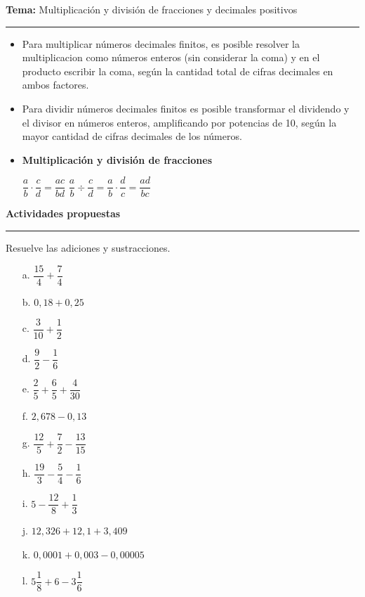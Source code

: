 \documentclass[spanish,letterpaper, 11pt, addpoints, answers]{exam}
\begin{document}
\begin{questions}
\newpage
  \vspace{0.1in}
  \parbox{6in}{
  \textbf{Tema:} Multiplicación y división de fracciones y decimales positivos}
  \vspace{0.15in}
  \hrule 
  
  \begin{itemize}
    \item Para multiplicar números decimales finitos, es posible resolver la multiplicacion como números enteros (sin considerar la coma) y en el producto escribir la coma, según la cantidad total de cifras decimales en ambos factores.
  
    \item Para dividir números decimales finitos es posible transformar el dividendo y el divisor en números enteros, amplificando por potencias de 10, según la mayor cantidad de cifras decimales de los números.

    \item \textbf{Multiplicación y división de fracciones}
\begin{center}
$\dfrac{a}{b}\cdot\dfrac{c}{d}=\dfrac{ac}{bd}$ \hspace{2cm} $\dfrac{a}{b}\div\dfrac{c}{d}=\dfrac{a}{b}\cdot\dfrac{d}{c}=\dfrac{ad}{bc}$

\end{center}

    
  \end{itemize}
  
  \parbox{6in}{
  \textbf{Actividades propuestas}}
  \vspace{0.15in}
  \hrule 

  \question Resuelve las adiciones y sustracciones.

  \begin{multicols}{2}
    
 
  \begin{itemize}
    \item[a.] $\dfrac{15}{4}+\dfrac{7}{4}$
    \item[b.] $0{,}18+0{,}25$
    \item[c.] $\dfrac{3}{10}+\dfrac{1}{2}$
    \item[d.] $\dfrac{9}{2}-\dfrac{1}{6}$
    \item[e.] $\dfrac{2}{5}+\dfrac{6}{5}+\dfrac{4}{30}$
    \item[f.] $2{,}678-0{,}13$
    \item[g.] $\dfrac{12}{5}+\dfrac{7}{2}-\dfrac{13}{15}$
    \item[h.] $\dfrac{19}{3}-\dfrac{5}{4}-\dfrac{1}{6}$
    \item[i.] $5-\dfrac{12}{8}+\dfrac{1}{3}$
    \item[j.] $12{,}326+12{,}1+3{,}409$
    \item[k.] $0{,}0001+0{,}003-0{,}00005$
    \item[l.] $5\dfrac{1}{8}+6-3\dfrac{1}{6}$  
  \end{itemize}
 \end{multicols}


\end{questions}
\end{document}
